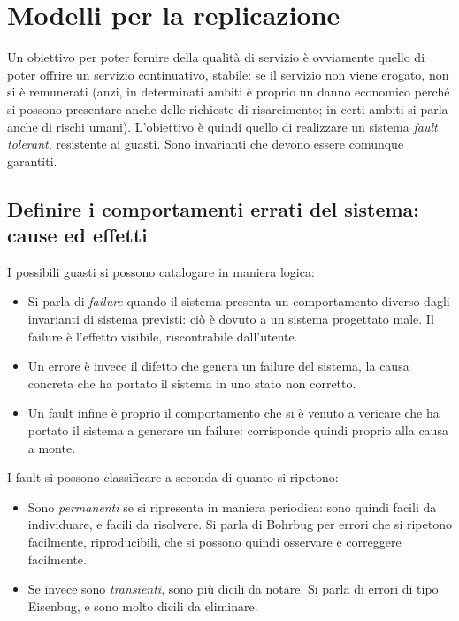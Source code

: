 \section{Modelli per la replicazione}
Un obiettivo per poter fornire della qualità di servizio è ovviamente quello di poter offrire un servizio continuativo,
stabile: se il servizio non viene erogato, non si è remunerati (anzi, in determinati ambiti è proprio un danno economico
perché si possono presentare anche delle richieste di risarcimento; in certi ambiti si parla anche di rischi umani).
L'obiettivo è quindi quello di realizzare un sistema \textit{fault tolerant}, resistente ai guasti. Sono invarianti che
devono essere comunque garantiti.
\subsection{Definire i comportamenti errati del sistema: cause ed effetti}
I possibili guasti si possono catalogare in maniera logica:
\begin{itemize}
 \item Si parla di \textit{failure} quando il sistema presenta un comportamento diverso dagli invarianti di sistema
previsti: ciò è dovuto a un sistema progettato male. Il failure è l'effetto visibile, riscontrabile dall'utente.
 \item Un errore è invece il difetto che genera un failure del sistema, la causa concreta che ha portato il sistema 
 in uno stato non corretto.
 \item Un fault infine è proprio il comportamento che si è venuto a vericare che ha portato il sistema a generare un
 failure: corrisponde quindi proprio alla causa a monte.
\end{itemize}
I fault si possono classificare a seconda di quanto si ripetono:
\begin{itemize}
 \item Sono \textit{permanenti} se si ripresenta in maniera periodica: sono quindi facili da individuare, e facili da
 risolvere. Si parla di Bohrbug per errori che si ripetono facilmente, riproducibili, che si possono quindi osservare
 e correggere facilmente.
 \item Se invece sono \textit{transienti}, sono più dicili da notare. Si parla di errori di tipo Eisenbug, e sono molto
 dicili da eliminare.
\end{itemize}

